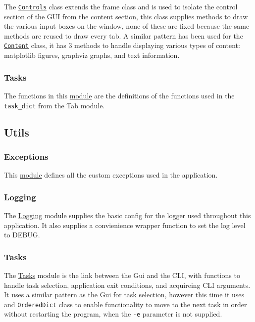 \documentclass[11pt]{article}
\newcommand{\code}[1]{\colorbox{light-gray}{\texttt{#1}}}
\begin{document}
The \href{https://www2.macs.hw.ac.uk/~sf52/DocuTrace/html/DocuTrace.Gui.html#DocuTrace.Gui.Tab.Controls}{\code{Controls}} class extends the frame class and is used to isolate the control section of the GUI from the content section, this class supplies methods to draw the various input boxes on the window, none of these are fixed because the same methods are reused to draw every tab.
A similar pattern has been used for the \href{https://www2.macs.hw.ac.uk/~sf52/DocuTrace/html/DocuTrace.Gui.html#DocuTrace.Gui.Tab.Content}{\code{Content}} class, it has 3 methods to handle displaying various types of content: matplotlib figures, graphviz graphs, and text information.

\subsubsection{Tasks}
The functions in this \href{https://www2.macs.hw.ac.uk/~sf52/DocuTrace/html/DocuTrace.Gui.html#module-DocuTrace.Gui.Tasks}{module} are the definitions of the functions used in the \code{task\_dict} from the Tab module. 

\subsection{Utils}
\subsubsection{Exceptions}
This \href{https://www2.macs.hw.ac.uk/~sf52/DocuTrace/html/DocuTrace.Utils.html#module-DocuTrace.Utils.Exceptions}{module} defines all the custom exceptions used in the application.

\subsubsection{Logging}
The \href{https://www2.macs.hw.ac.uk/~sf52/DocuTrace/html/DocuTrace.Utils.html#module-DocuTrace.Utils.Logging}{Logging} module supplies the basic config for the logger used throughout this application.
It also supplies a convienience wrapper function to set the log level to DEBUG.


\subsubsection{Tasks}
The \href{https://www2.macs.hw.ac.uk/~sf52/DocuTrace/html/DocuTrace.Utils.html#module-DocuTrace.Utils.Tasks}{Tasks} module is the link between the Gui and the CLI, with functions to handle task selection, application exit conditions, and acquireing CLI arguments.
It uses a similar pattern as the Gui for task selection, however this time it uses and \code{OrderedDict} class to enable functionality to move to the next task in order without restarting the program, when the \code{-e} parameter is not supplied.
\end{document}
